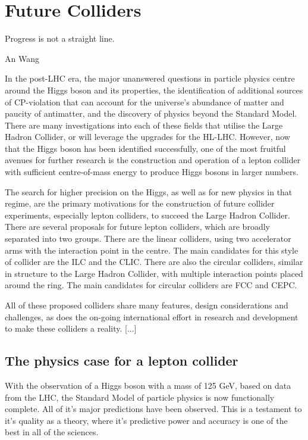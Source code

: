 \chapter{Future Colliders}
\label{chapter:colliders}

\epigraph{Progress is not a straight line.}{An Wang}

In the post-LHC era, the major unanswered questions in particle physics centre around the Higgs boson and its properties, the identification of additional sources of CP-violation that can account for the universe's abundance of matter and paucity of antimatter, and the discovery of physics beyond the Standard Model. There are many investigations into each of these fields that utilise the Large Hadron Collider, or will leverage the upgrades for the \acrfull{HL-LHC}. However, now that the Higgs boson has been identified successfully, one of the most fruitful avenues for further research is the construction and operation of a lepton collider with sufficient centre-of-mass energy to produce Higgs bosons in larger numbers.

The search for higher precision on the Higgs, as well as for new physics in that regime, are the primary motivations for the construction of future collider experiments, especially lepton colliders, to succeed the Large Hadron Collider. There are several proposals for future lepton colliders, which are broadly separated into two groups. There are the linear colliders, using two accelerator arms with the interaction point in the centre. The main candidates for this style of collider are the \acrfull{ILC} and the \acrfull{CLIC}. There are also the circular colliders, similar in structure to the Large Hadron Collider, with multiple interaction points placed around the ring. The main candidates for circular colliders are \acrfull{FCC} and \acrfull{CEPC}. 

All of these proposed colliders share many features, design considerations and challenges, as does the on-going international effort in research and development to make these colliders a reality. [...]

\section{The physics case for a lepton collider}
With the observation of a Higgs boson with a mass of 125 GeV, based on data from the \acrlong{LHC}, the Standard Model of particle physics is now functionally complete. All of it's major predictions have been observed. This is a testament to it's quality as a theory, where it's predictive power and accuracy is one of the best in all of the sciences.

